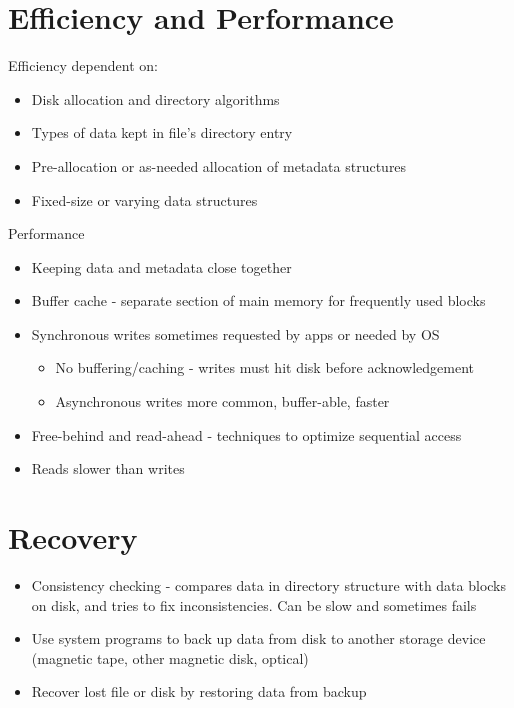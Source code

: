 \documentclass{article}[18pt]
\begin{document}
\section{Efficiency and Performance}
Efficiency dependent on:
\begin{itemize}
	\item Disk allocation and directory algorithms
	\item Types of data kept in file's directory entry
	\item Pre-allocation or as-needed allocation of metadata structures
	\item Fixed-size or varying data structures
\end{itemize}
Performance
\begin{itemize}
	\item Keeping data and metadata close together
	\item Buffer cache - separate section of main memory for frequently used blocks
	\item Synchronous writes sometimes requested by apps or needed by OS
	\begin{itemize}
		\item No buffering/caching - writes must hit disk before acknowledgement
		\item Asynchronous writes more common, buffer-able, faster
	\end{itemize}
	\item Free-behind and read-ahead - techniques to optimize sequential access
	\item Reads slower than writes
\end{itemize}
\section{Recovery}
\begin{itemize}
	\item Consistency checking - compares data in directory structure with data blocks on disk, and tries to fix inconsistencies. Can be slow and sometimes fails
	\item Use system programs to back up data from disk to another storage device (magnetic tape, other magnetic disk, optical)
	\item Recover lost file or disk by restoring data from backup
\end{itemize}
\end{document}
